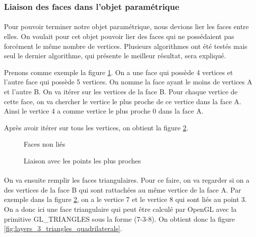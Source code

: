 \documentclass[article, backcover, french, nodocumentinfo]{upmethodology-document}
\begin{document}
	\subsubsection{Liaison des faces dans l'objet paramétrique}
		\paragraph{} Pour pouvoir terminer notre objet paramétrique, nous devions lier les faces entre elles. On voulait pour cet objet pouvoir lier des faces qui ne possédaient pas forcément le même nombre de vertices. Plusieurs algorithmes ont été testés mais seul le dernier algorithme, qui présente le meilleur résultat, sera expliqué.
		
		Prenons comme exemple la figure \ref{fig:layers_1_empty}. On a une face qui possède 4 vertices et l'autre face qui possède 5 vertices. On nomme la face ayant le moins de vertices A et l'autre B. On va itérer sur les vertices de la face B. Pour chaque vertice de cette face, on va chercher le vertice le plus proche de ce vertice dans la face A. Ainsi le vertice 4 a comme vertice le plus proche 0 dans la face A.
		
		Après avoir itérer sur tous les vertices, on obtient la figure \ref{fig:layers_2_nearest_lines}.
		
		\par\noindent\begin{minipage}[t]{\textwidth}
			\centering
			\begin{minipage}[t]{0.49\textwidth}
				\begin{figure}[H]
					\centering%
					\caption{Faces non liés}%
					\label{fig:layers_1_empty}%
				\end{figure}
			\end{minipage}
			\begin{minipage}[t]{0.49\textwidth}
				\begin{figure}[H]
					\centering%
					\caption{Liaison avec les points les plus proches}%
					\label{fig:layers_2_nearest_lines}%
				\end{figure}
			\end{minipage}
		\end{minipage}
		\paragraph{} On va ensuite remplir les faces triangulaires. Pour ce faire, on va regarder si on a des vertices de la face B qui sont rattachées au même vertice de la face A. Par exemple dans la figure \ref{fig:layers_2_nearest_lines}, on a le vertice 7 et le vertice 8 qui sont liés au point 3. On a donc ici une face triangulaire qui peut être calculé par OpenGL avec la primitive GL\_TRIANGLES sous la forme (7-3-8). On obtient donc la figure \ref{fig:layers_3_triangles_quadrilaterals}.
		
\end{document}
